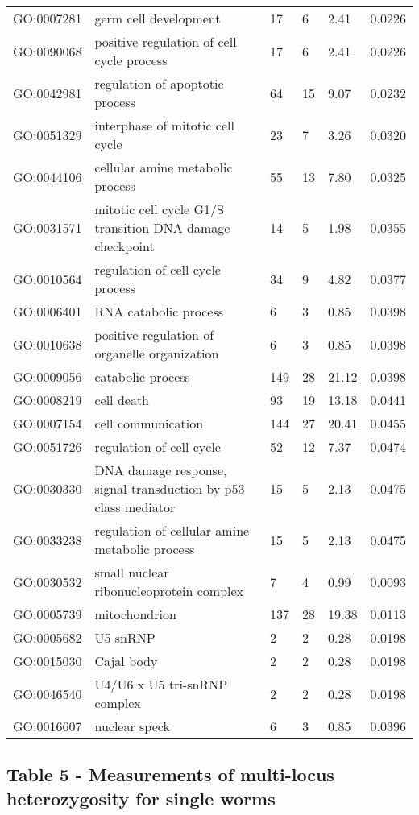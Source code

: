 \documentclass[10pt]{bmc_article}
\newenvironment{bmcformat}{\begin{raggedright}\baselineskip20pt\sloppy\setboolean{publ}{false}}{\end{raggedright}\baselineskip20pt\sloppy}
\begin{document}
\begin{bmcformat}
\begin{longtable}{lp{4.5cm}llll}
  GO:0007281 & germ cell development &  17 &   6 & 2.41 & 0.0226 \\ 
  GO:0090068 & positive regulation of cell cycle process &  17 &   6 & 2.41 & 0.0226 \\ 
  GO:0042981 & regulation of apoptotic process &  64 &  15 & 9.07 & 0.0232 \\ 
  GO:0051329 & interphase of mitotic cell cycle &  23 &   7 & 3.26 & 0.0320 \\ 
  GO:0044106 & cellular amine metabolic process &  55 &  13 & 7.80 & 0.0325 \\ 
  GO:0031571 & mitotic cell cycle G1/S transition DNA damage checkpoint &  14 &   5 & 1.98 & 0.0355 \\ 
  GO:0010564 & regulation of cell cycle process &  34 &   9 & 4.82 & 0.0377 \\ 
  GO:0006401 & RNA catabolic process &   6 &   3 & 0.85 & 0.0398 \\ 
  GO:0010638 & positive regulation of organelle organization &   6 &   3 & 0.85 & 0.0398 \\ 
  GO:0009056 & catabolic process & 149 &  28 & 21.12 & 0.0398 \\ 
  GO:0008219 & cell death &  93 &  19 & 13.18 & 0.0441 \\ 
  GO:0007154 & cell communication & 144 &  27 & 20.41 & 0.0455 \\ 
  GO:0051726 & regulation of cell cycle &  52 &  12 & 7.37 & 0.0474 \\ 
  GO:0030330 & DNA damage response, signal transduction by p53 class mediator &  15 &   5 & 2.13 & 0.0475 \\ 
  GO:0033238 & regulation of cellular amine metabolic process &  15 &   5 & 2.13 & 0.0475 \\ 
   \hline
GO:0030532 & small nuclear ribonucleoprotein complex &   7 &   4 & 0.99 & 0.0093 \\ 
  GO:0005739 & mitochondrion & 137 &  28 & 19.38 & 0.0113 \\ 
  GO:0005682 & U5 snRNP &   2 &   2 & 0.28 & 0.0198 \\ 
  GO:0015030 & Cajal body &   2 &   2 & 0.28 & 0.0198 \\ 
  GO:0046540 & U4/U6 x U5 tri-snRNP complex &   2 &   2 & 0.28 & 0.0198 \\ 
  GO:0016607 & nuclear speck &   6 &   3 & 0.85 & 0.0396 \\ 
   \hline
\hline
\end{longtable}
\newpage
\subsection*{Table 5 - Measurements of multi-locus heterozygosity for
  single worms}


\end{bmcformat}
\end{document}
